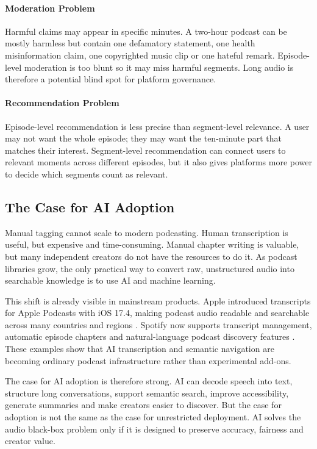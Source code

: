 \documentclass[11pt,a4paper]{article}
\begin{document}
\paragraph{Moderation Problem}

Harmful claims may appear in specific minutes. A two-hour podcast can be mostly harmless but contain one defamatory statement, one health misinformation claim, one copyrighted music clip or one hateful remark. Episode-level moderation is too blunt so it may miss harmful segments. Long audio is therefore a potential blind spot for platform governance.

\paragraph{Recommendation Problem}

Episode-level recommendation is less precise than segment-level relevance. A user may not want the whole episode; they may want the ten-minute part that matches their interest. Segment-level recommendation can connect users to relevant moments across different episodes, but it also gives platforms more power to decide which segments count as relevant.

\subsection{The Case for AI Adoption}

Manual tagging cannot scale to modern podcasting. Human transcription is useful, but expensive and time-consuming. Manual chapter writing is valuable, but many independent creators do not have the resources to do it. As podcast libraries grow, the only practical way to convert raw, unstructured audio into searchable knowledge is to use AI and machine learning.

This shift is already visible in mainstream products. Apple introduced transcripts for Apple Podcasts with iOS 17.4, making podcast audio readable and searchable across many countries and regions \cite{Apple2024Transcripts}. Spotify now supports transcript management, automatic episode chapters and natural-language podcast discovery features \cite{Spotify2025Transcripts,Spotify2025Chapters,Spotify2026Prompted}. These examples show that AI transcription and semantic navigation are becoming ordinary podcast infrastructure rather than experimental add-ons.

The case for AI adoption is therefore strong. AI can decode speech into text, structure long conversations, support semantic search, improve accessibility, generate summaries and make creators easier to discover. But the case for adoption is not the same as the case for unrestricted deployment. AI solves the audio black-box problem only if it is designed to preserve accuracy, fairness and creator value.
\end{document}
